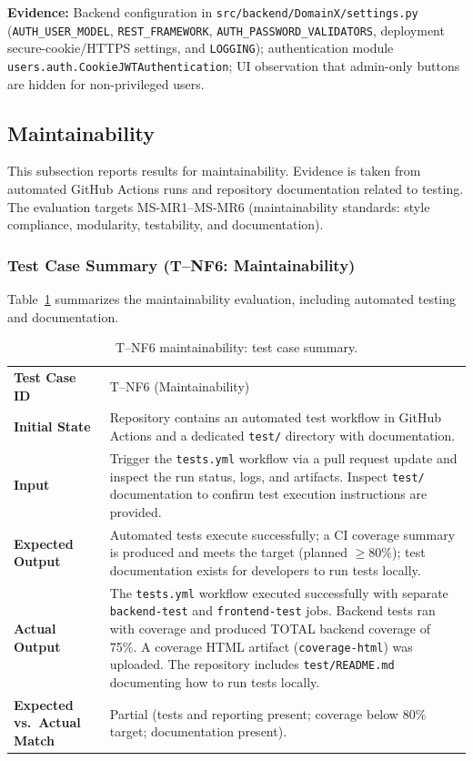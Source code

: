 \documentclass[12pt, titlepage]{article}
\begin{document}
\noindent \textbf{Evidence:} Backend configuration in
\texttt{src/backend/DomainX/settings.py} (\texttt{AUTH\_USER\_MODEL},
\texttt{REST\_FRAMEWORK}, \texttt{AUTH\_PASSWORD\_VALIDATORS},
deployment secure-cookie/HTTPS settings, and \texttt{LOGGING}); authentication
module \texttt{users.auth.CookieJWTAuthentication}; UI observation that
admin-only buttons are hidden for non-privileged users.

\subsection{Maintainability}
\label{sec:nfr-maintainability}

This subsection reports results for maintainability.  Evidence is
taken from automated GitHub Actions runs and repository documentation related
to testing.  The evaluation targets MS-MR1--MS-MR6 (maintainability standards:
style compliance, modularity, testability, and documentation).

\subsubsection{Test Case Summary (T--NF6: Maintainability)}
Table~\ref{tab:tnf6-summary} summarizes the maintainability evaluation, including automated testing and documentation.
\begin{table}[H]
  \centering
  \caption{T--NF6 maintainability: test case summary.}
  \label{tab:tnf6-summary}
  \begin{tabular}{@{}p{}p{}@{}}
    \toprule
    \textbf{Test Case ID} &
      T--NF6 (Maintainability) \\
    \textbf{Initial State} &
      Repository contains an automated test workflow in GitHub Actions and a
      dedicated \texttt{test/} directory with documentation. \\
    \textbf{Input} &
      Trigger the \texttt{tests.yml} workflow via a pull request update and
      inspect the run status, logs, and artifacts.  Inspect \texttt{test/}
      documentation to confirm test execution instructions are provided. \\
    \textbf{Expected Output} &
      Automated tests execute successfully; a CI coverage summary is produced
      and meets the target (planned $\geq 80\%$); test documentation exists for
      developers to run tests locally. \\
    \textbf{Actual Output} &
      The \texttt{tests.yml} workflow executed successfully with separate
      \texttt{backend-test} and \texttt{frontend-test} jobs.  Backend tests ran
      with coverage and produced TOTAL backend coverage of 75\%.  A coverage
      HTML artifact (\texttt{coverage-html}) was uploaded.  The repository
      includes \texttt{test/README.md} documenting how to run tests locally. \\
    \textbf{Expected vs.\ Actual Match} &
      Partial (tests and reporting present; coverage below 80\% target;
      documentation present). \\
    \bottomrule
  \end{tabular}
\end{table}
\end{document}
